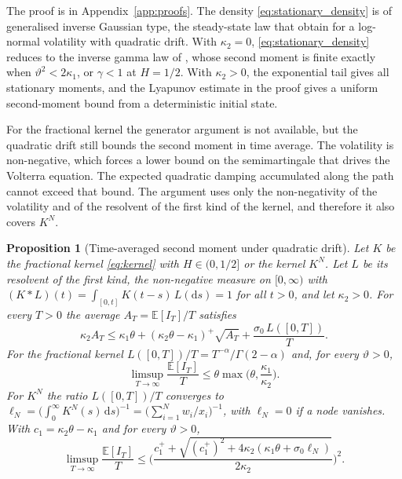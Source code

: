 \documentclass[11pt,a4paper]{article}
\newtheorem{proposition}[theorem]{Proposition}
\theoremstyle{definition}
\newcommand{\D}{\mathrm{d}}
\newcommand{\E}{\mathbb{E}}
\begin{document}
The proof is in Appendix~\ref{app:proofs}.
The density \eqref{eq:stationary_density} is of generalised inverse Gaussian type, the steady-state law that \citet{CarrWillems2019} obtain for a log-normal volatility with quadratic drift.
With $\kappa_2=0$, \eqref{eq:stationary_density} reduces to the inverse gamma law of \citet{SeppRakhmonov2023}, whose second moment is finite exactly when $\vartheta^2<2\kappa_1$, or $\gamma<1$ at $H=1/2$. With $\kappa_2>0$, the exponential tail gives all stationary moments, and the Lyapunov estimate in the proof gives a uniform second-moment bound from a deterministic initial state.

For the fractional kernel the generator argument is not available, but the quadratic drift still bounds the second moment in time average. The volatility is non-negative, which forces a lower bound on the semimartingale that drives the Volterra equation. The expected quadratic damping accumulated along the path cannot exceed that bound. The argument uses only the non-negativity of the volatility and of the resolvent of the first kind of the kernel, and therefore it also covers $K^N$.

\begin{proposition}[Time-averaged second moment under quadratic drift]\label{prop:cesaro}
Let $K$ be the fractional kernel \eqref{eq:kernel} with $H\in(0,1/2]$ or the kernel $K^N$. Let $L$ be its resolvent of the first kind, the non-negative measure on $[0,\infty)$ with $(K*L)(t)=\int_{[0,t]}K(t-s)\,L(\D s)=1$ for all $t>0$, and let $\kappa_2>0$. For every $T>0$ the average $A_T=\E[I_T]/T$ satisfies
\begin{equation}\label{eq:cesaro}
\kappa_2A_T\le\kappa_1\theta+(\kappa_2\theta-\kappa_1)^+\sqrt{A_T}+\frac{\sigma_0\,L([0,T])}{T} .
\end{equation}
For the fractional kernel $L([0,T])/T=T^{-\alpha}/\Gamma(2-\alpha)$ and, for every $\vartheta>0$,
\begin{equation}\label{eq:cesaro_limit}
\limsup_{T\to\infty}\frac{\E[I_T]}{T}\le\theta\max\Big(\theta,\frac{\kappa_1}{\kappa_2}\Big) .
\end{equation}
For $K^N$ the ratio $L([0,T])/T$ converges to $\ell_N=\big(\int_0^\infty K^N(s)\,\D s\big)^{-1}=\big(\sum_{i=1}^Nw_i/x_i\big)^{-1}$, with $\ell_N=0$ if a node vanishes. With $c_1=\kappa_2\theta-\kappa_1$ and for every $\vartheta>0$,
\begin{equation}\label{eq:cesaro_limit_N}
\limsup_{T\to\infty}\frac{\E[I_T]}{T}\le\bigg(\frac{c_1^++\sqrt{(c_1^+)^2+4\kappa_2(\kappa_1\theta+\sigma_0\ell_N)}}{2\kappa_2}\bigg)^{2} .
\end{equation}
\end{proposition}
\end{document}
